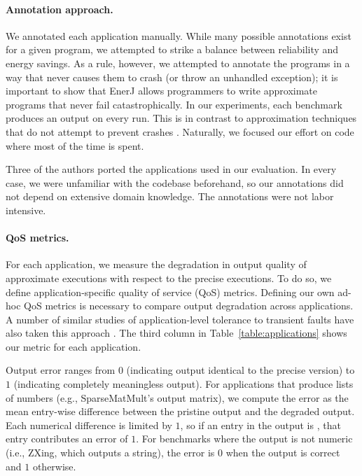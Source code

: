 \paragraph{Annotation approach.} We annotated each application
manually. While many possible
annotations exist for a given program, we attempted to strike a
balance between reliability and energy savings. As a rule, however, we
attempted to annotate the programs in a way that never causes
them to crash (or throw an unhandled exception); it is important to
show that EnerJ allows programmers to write approximate programs that
never fail catastrophically. In our experiments, each benchmark produces
an output on every run. This is in contrast to approximation techniques
that do not attempt to prevent crashes \cite{flikker, wong-selse06, li07}.
Naturally, we focused our effort on code where most of the
time is spent.

Three of the authors ported the applications used in our
evaluation. In every case, we were unfamiliar with the codebase
beforehand, so our annotations did not depend on extensive domain
knowledge. The annotations were not labor intensive.


\paragraph{QoS metrics.} For each application, we measure the
degradation in output quality of approximate executions with respect
to the precise executions. To do so, we define application-specific
quality of service (QoS) metrics. Defining our own ad-hoc QoS metrics
is necessary to compare output degradation across applications.
A number of similar studies of
application-level tolerance to transient faults have also taken this
approach \cite{qosprof, green, dekruijf-selse09, ersa, wong-selse06,
  softcomputing}. The third column in
Table~\ref{table:applications} shows our metric for each application.

Output error ranges from $0$ (indicating output identical to the
precise version) to $1$ (indicating completely meaningless output). For
applications that produce lists of numbers (e.g., SparseMatMult's output
matrix), we compute the error as the mean entry-wise difference between the
pristine output and the degraded output. Each numerical difference is limited
by $1$, so if an entry in the output is ,
that entry contributes an error of $1$. For benchmarks where the output is not
numeric (i.e., ZXing, which outputs a string), the error is $0$ when the output
is correct and $1$ otherwise. %


